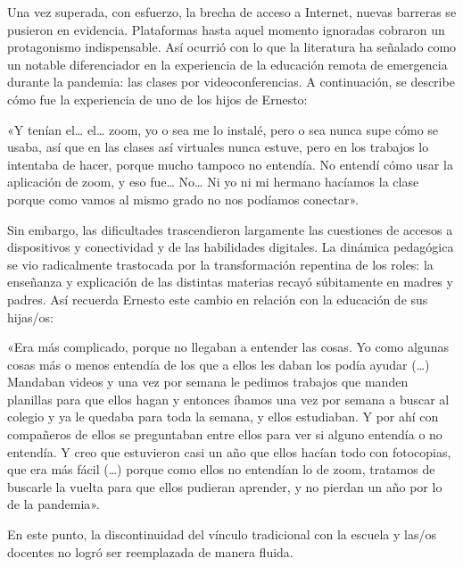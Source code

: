 \begin{refsection}
Una vez superada, con esfuerzo, la brecha de acceso a Internet, nuevas barreras se pusieron en evidencia. Plataformas hasta aquel momento ignoradas cobraron un protagonismo indispensable. Así ocurrió con lo que la literatura ha señalado como un notable diferenciador en la experiencia de la educación remota de emergencia durante la pandemia: las clases por videoconferencias. A continuación, se describe cómo fue la experiencia de uno de los hijos de Ernesto:


\begin{gbcita}
«Y tenían el… el… zoom, yo o sea me lo instalé, pero o sea nunca supe cómo se usaba, así que en las clases así virtuales nunca estuve, pero en los trabajos lo intentaba de hacer, porque mucho tampoco no entendía. No entendí cómo usar la aplicación de zoom, y eso fue… No… Ni yo ni mi hermano hacíamos la clase porque como vamos al mismo grado no nos podíamos conectar».

\end{gbcita}

Sin embargo, las dificultades trascendieron largamente las cuestiones de accesos a dispositivos y conectividad y de las habilidades digitales. La dinámica pedagógica se vio radicalmente trastocada por la transformación repentina de los roles: la enseñanza y explicación de las distintas materias recayó súbitamente en madres y padres. Así recuerda Ernesto este cambio en relación con la educación de sus hijas/os:


\begin{gbcita}
«Era más complicado, porque no llegaban a entender las cosas. Yo como algunas cosas más o menos entendía de los que a ellos les daban los podía ayudar (…) Mandaban videos y una vez por semana le pedimos trabajos que manden planillas para que ellos hagan y entonces íbamos una vez por semana a buscar al colegio y ya le quedaba para toda la semana, y ellos estudiaban. Y por ahí con compañeros de ellos se preguntaban entre ellos para ver si alguno entendía o no entendía. Y creo que estuvieron casi un año que ellos hacían todo con fotocopias, que era más fácil (…) porque como ellos no entendían lo de zoom, tratamos de buscarle la vuelta para que ellos pudieran aprender, y no pierdan un año por lo de la pandemia».

\end{gbcita}

En este punto, la discontinuidad del vínculo tradicional con la escuela y las/os docentes no logró ser reemplazada de manera fluida.



\end{refsection}
